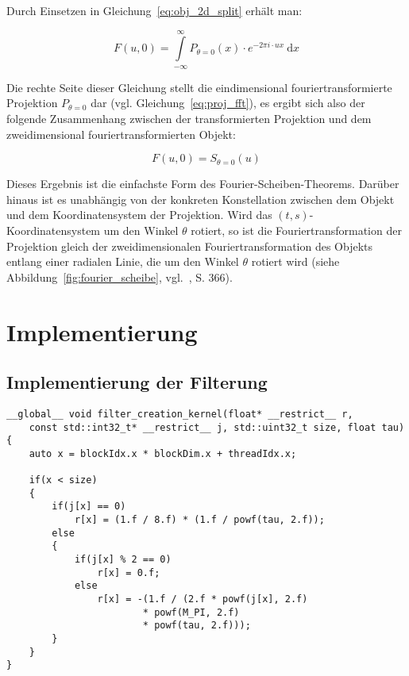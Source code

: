 Durch Einsetzen in Gleichung~\ref{eq:obj_2d_split} erhält man:

\begin{equation}
    F(u, 0) = \int\limits_{-\infty}^{\infty} P_{\theta = 0}(x) \cdot e^{-2 \pi i \cdot u x}\ \mathrm{d} x
\end{equation}

Die rechte Seite dieser Gleichung stellt die eindimensional fouriertransformierte Projektion $P_{\theta = 0}$ dar (vgl.
Gleichung~\ref{eq:proj_fft}), es ergibt sich also der folgende Zusammenhang zwischen der transformierten Projektion und
dem zweidimensional fouriertransformierten Objekt:

\begin{equation}
    F(u, 0) = S_{\theta = 0}(u)
\end{equation}

Dieses Ergebnis ist die einfachste Form des Fourier-Scheiben-Theorems. Darüber hinaus ist es unabhängig von der
konkreten Konstellation zwischen dem Objekt und dem Koordinatensystem der Projektion. Wird das
$(t, s)$-Koordinatensystem um den Winkel $\theta$ rotiert, so ist die Fouriertransformation der Projektion gleich der
zweidimensionalen Fouriertransformation des Objekts entlang einer radialen Linie, die um den Winkel $\theta$ rotiert
wird (siehe Abbildung~\ref{fig:fourier_scheibe}, vgl.~\cite{rosenkak}, S. 366).

\chapter{Implementierung}

\section{Implementierung der Filterung}

\begin{code}
\begin{verbatim}
__global__ void filter_creation_kernel(float* __restrict__ r,
    const std::int32_t* __restrict__ j, std::uint32_t size, float tau)
{
    auto x = blockIdx.x * blockDim.x + threadIdx.x;

    if(x < size)
    {
        if(j[x] == 0)
            r[x] = (1.f / 8.f) * (1.f / powf(tau, 2.f));
        else
        {
            if(j[x] % 2 == 0)
                r[x] = 0.f;
            else
                r[x] = -(1.f / (2.f * powf(j[x], 2.f)
                        * powf(M_PI, 2.f)
                        * powf(tau, 2.f)));
        }
    }
}
\end{verbatim}
\label{app:filter_gen}
\end{code}


